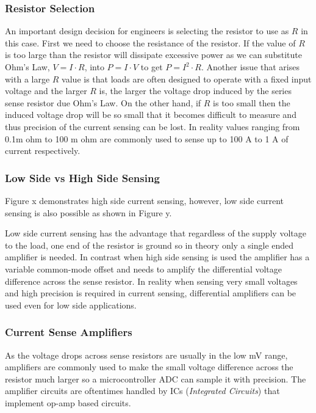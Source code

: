 \documentclass[main.tex]{subfiles}
\begin{document}
\subsubsection{Resistor Selection}
An important design decision for engineers is selecting the resistor to use as $R$ in this case. First we need to choose the resistance of the resistor. If the value of $R$ is too large than the resistor will dissipate excessive power as we can substitute Ohm's Law, $V=I \cdot R$, into $P=I \cdot V$ to get $P=I^{2} \cdot R$. Another issue that arises with a large $R$ value is that loads are often designed to operate with a fixed input voltage and the larger $R$ is, the larger the voltage drop induced by the series sense resistor due Ohm's Law. On the other hand, if $R$ is too small then the induced voltage drop will be so small that it becomes difficult to measure and thus precision of the current sensing can be lost. In reality values ranging from 0.1m ohm to 100 m ohm are commonly used to sense up to 100 A to 1 A of current respectively.

\subsubsection{Low Side vs High Side Sensing}
Figure x demonstrates high side current sensing, however, low side current sensing is also possible as shown in Figure y.


Low side current sensing has the advantage that regardless of the supply voltage to the load, one end of the resistor is ground so in theory only a single ended amplifier is needed. In contrast when high side sensing is used the amplifier has a variable common-mode offset and needs to amplify the differential voltage difference across the sense resistor. In reality when sensing very small voltages and high precision is required in current sensing, differential amplifiers can be used even for low side applications.

\subsubsection{Current Sense Amplifiers}
As the voltage drops across sense resistors are usually in the low mV range, amplifiers are commonly used to make the small voltage difference across the resistor much larger so a microcontroller ADC can sample it with precision. The amplifier circuits are oftentimes handled by ICs (\textit{Integrated Circuits}) that implement op-amp based circuits. 
\end{document}
